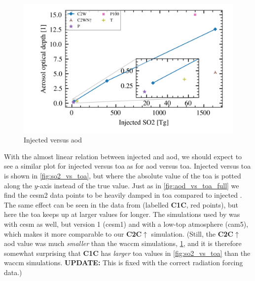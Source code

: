 \documentclass[twocol]{ametsocV5}
\newcommand{\iso}[1][i]{{#1}njected \ce{SO2}}
\begin{document}
\begin{figure}
  \begin{center}
    \includegraphics[width=0.95\linewidth]{figures/injection_vs_aod.png}
  \end{center}
  \caption{Injected  versus \acrshort{aod}}%
  \label{fig:so2_vs_aod}
\end{figure}


With the almost linear relation between injected  and \acrshort{aod}, we should
expect to see a similar plot for \iso{} versus \acrshort{toa} as for \acrshort{aod}
versus \acrshort{toa}. \iso[I] versus \acrshort{toa} is shown in \cref{fig:so2_vs_toa},
but where the absolute value of the \acrshort{toa} is potted along the \( y \)-axis
instead of the true value. Just as in \cref{fig:aod_vs_toa_full} we find the
\acrshort{cesm2} data points to be heavily damped in \acrshort{toa} compared to \iso.
The same effect can be seen in the data from \citet{ottobliesner2016} (labelled
\textbf{C1C}, red points), but here the \acrshort{toa} keeps up at larger values for
longer. The simulations used by \citet{ottobliesner2016} was with \acrshort{cesm} as
well, but version 1 (\acrshort{cesm1}) and with a low-top atmosphere (\acrshort{cam5}),
which makes it more comparable to our \textbf{C2C\(\uparrow\)} simulation. (Still, the
\textbf{C2C\(\uparrow\)} \acrshort{aod} value was much \emph{smaller} than the
\acrshort{waccm} simulations, \cref{fig:so2_vs_aod}, and it is therefore somewhat
surprising that \textbf{C1C} has \emph{larger} \acrshort{toa} values in
\cref{fig:so2_vs_toa} than the \acrshort{waccm} simulations. \textbf{UPDATE:} This is
fixed with the correct radiation forcing data.)
\end{document}
